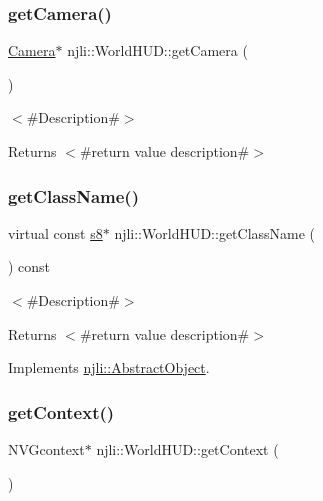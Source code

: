 \subsubsection{\texorpdfstring{get\+Camera()}{getCamera()}}
{\footnotesize\ttfamily \mbox{\hyperlink{classnjli_1_1_camera}{Camera}}$\ast$ njli\+::\+World\+H\+U\+D\+::get\+Camera (\begin{DoxyParamCaption}{ }\end{DoxyParamCaption})}

$<$\#\+Description\#$>$

\begin{DoxyReturn}{Returns}
$<$\#return value description\#$>$ 
\end{DoxyReturn}
\mbox{\label{classnjli_1_1_world_h_u_d_a77e75b1900ecb22d4e07a46b430f29d3}} 
\subsubsection{\texorpdfstring{get\+Class\+Name()}{getClassName()}}
{\footnotesize\ttfamily virtual const \mbox{\hyperlink{_util_8h_a2ff401e087cf786c38a6812723e94473}{s8}}$\ast$ njli\+::\+World\+H\+U\+D\+::get\+Class\+Name (\begin{DoxyParamCaption}{ }\end{DoxyParamCaption}) const\hspace{0.3cm}{\ttfamily [virtual]}}

$<$\#\+Description\#$>$

\begin{DoxyReturn}{Returns}
$<$\#return value description\#$>$ 
\end{DoxyReturn}


Implements \mbox{\hyperlink{classnjli_1_1_abstract_object_afdabb48c4bf763e297ffe810b433a863}{njli\+::\+Abstract\+Object}}.

\mbox{\label{classnjli_1_1_world_h_u_d_ac4de9e7e89d1d14b047e16f3fc3ba86a}} 
\subsubsection{\texorpdfstring{get\+Context()}{getContext()}}
{\footnotesize\ttfamily N\+V\+Gcontext$\ast$ njli\+::\+World\+H\+U\+D\+::get\+Context (\begin{DoxyParamCaption}{ }\end{DoxyParamCaption})\hspace{0.3cm}{\ttfamily [protected]}}

